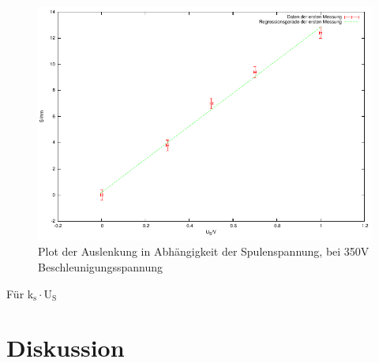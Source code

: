 \documentclass[12pt]{scrartcl}
\begin{document}
\begin{figure}[htbp] 
  \centering
    \includegraphics[scale = 1]{b_3.pdf}
  	\caption[Plot der Auslenkung in Abhängigkeit der Spulenspannung, bei 350V Beschleunigungsspannung]{Plot der Auslenkung in Abhängigkeit der Spulenspannung, bei 350V Beschleunigungsspannung}
  \label{fig:x_1}
\end{figure}

Für k$_\text{s} \cdot \text{U}_\text{S}$
\newpage
\section{Diskussion}


\end{document}
